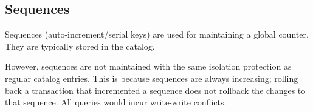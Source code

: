 \documentclass[11pt]{article}
\begin{document}
\subsection*{Sequences}
Sequences (auto-increment/serial keys) are used for maintaining a global counter. They are typically stored in the catalog. 

However, sequences are not maintained with the same isolation protection as regular catalog entries. This is because sequences are always increasing; rolling back a transaction that incremented a sequence does not rollback the changes to that sequence. All  queries would incur write-write conflicts.

\newpage


\end{document}
